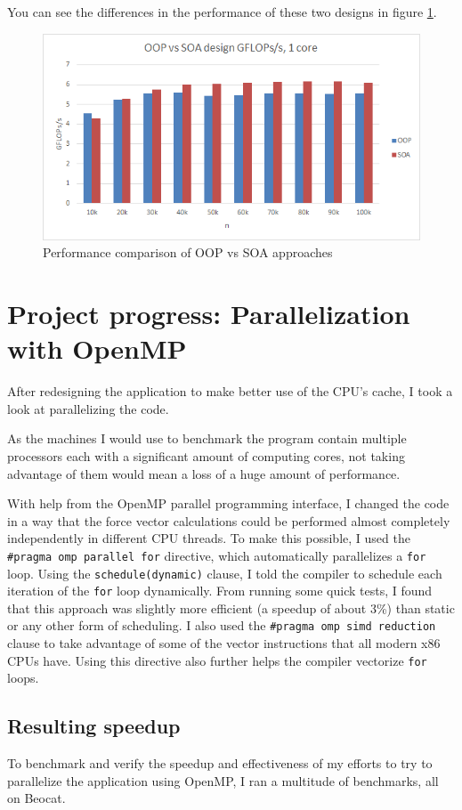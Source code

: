 \documentclass[journal]{IEEEtran}
\begin{document}
			You can see the differences in the performance of these two designs in figure \ref{oopsoa}.		
			
			\begin{figure}[ht]			
				\centering
				\includegraphics[width=.45\textwidth]{oop_vs_soa.png}
				\caption{\label{oopsoa}Performance comparison of OOP vs SOA approaches}
			\end{figure} 
	
	\section{Project progress: Parallelization with OpenMP}
	
		After redesigning the application to make better use of the CPU's cache, I took a look at parallelizing the code.
		
		As the machines I would use to benchmark the program contain multiple processors each with a significant amount of computing cores, not taking advantage of them would mean a loss of a huge amount of performance.
		
		With help from the OpenMP parallel programming interface, I changed the code in a way that the force vector calculations could be performed almost completely independently in different CPU threads. To make this possible, I used the \texttt{\#pragma omp parallel for} directive, which automatically parallelizes a \texttt{for} loop. Using the \texttt{schedule(dynamic)} clause, I told the compiler to schedule each iteration of the \texttt{for} loop dynamically. From running some quick tests, I found that this approach was slightly more efficient (a speedup of about 3\%) than static or any other form of scheduling. I also used the \texttt{\#pragma omp simd reduction} clause to take advantage of some of the vector instructions that all modern x86 CPUs have. Using this directive also further helps the compiler vectorize \texttt{for} loops.
		
		\subsection*{Resulting speedup}
			To benchmark and verify the speedup and effectiveness of my efforts to try to parallelize the application using OpenMP, I ran a multitude of benchmarks, all on Beocat.
			
\end{document}
